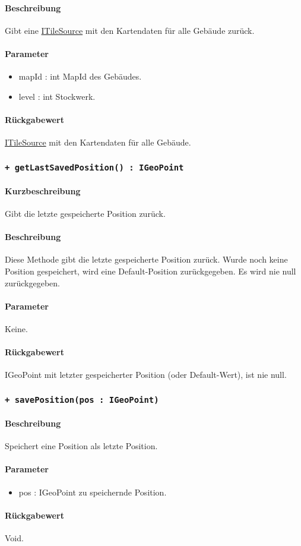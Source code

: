 \paragraph*{Beschreibung}
Gibt eine \href{https://osmdroid.github.io/osmdroid/javadocAll/org/osmdroid/tileprovider/tilesource/ITileSource.html}
{ITileSource} mit den Kartendaten für alle Gebäude zurück.
\paragraph*{Parameter}
\begin{itemize}
    \item mapId : int MapId des Gebäudes.
    \item level : int Stockwerk.
\end{itemize}
\paragraph*{Rückgabewert}
\href{https://osmdroid.github.io/osmdroid/javadocAll/org/osmdroid/tileprovider/tilesource/ITileSource.html}
{ITileSource} mit den Kartendaten für alle Gebäude.

\subsubsection{\texttt{+ getLastSavedPosition() : IGeoPoint}}%
\paragraph*{Kurzbeschreibung}
Gibt die letzte gespeicherte Position zurück.
\paragraph*{Beschreibung}
Diese Methode gibt die letzte gespeicherte Position zurück. Wurde noch keine Position gespeichert,
wird eine Default-Position zurückgegeben. Es wird nie null zurückgegeben.
\paragraph*{Parameter}
Keine.
\paragraph*{Rückgabewert}
IGeoPoint mit letzter gespeicherter Position (oder Default-Wert), ist nie null.

\subsubsection{\texttt{+ savePosition(pos : IGeoPoint)}}%
\paragraph*{Beschreibung}
Speichert eine Position als letzte Position.
\paragraph*{Parameter}
\begin{itemize}
    \item pos : IGeoPoint zu speichernde Position.
\end{itemize}
\paragraph*{Rückgabewert}
Void.
